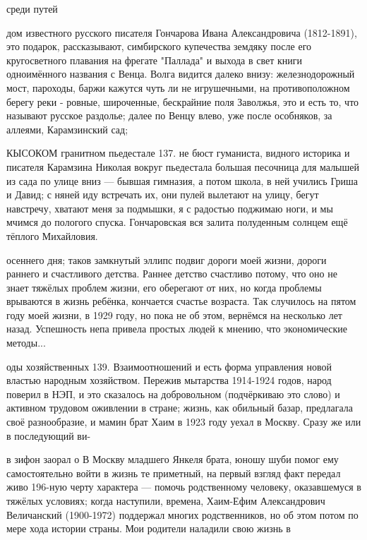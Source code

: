 \label{136-1}
среди путей

дом известного русского писателя Гончарова Ивана Александровича (1812-1891), это подарок, рассказывают, симбирского купечества земдяку после его кругосветного плавания на фрегате "Паллада" и выхода в свет книги одноимённого названия с Венца. Волга видится далеко внизу: железнодорожный мост, пароходы, баржи кажутся чуть ли не игрушечными, на противоположном берегу реки - ровные, широченные, бескрайние поля Заволжья, это и есть то, что называют русское раздолье; далее по Венцу влево, уже после особняков, за аллеями, Карамзинский сад;

\label{137-1}
КЫСОКОМ гранитном пьедестале 137. не бюст гуманиста, видного историка и писателя Карамзина Николая вокруг пьедестала большая песочница для малышей из сада по улице вниз — бывшая гимназия, а потом школа, в ней учились Гриша и Давид; с няней иду встречать их, они пулей вылетают на улицу, бегут навстречу, хватают меня за подмышки, я с радостью поджимаю ноги, и мы мчимся до пологого спуска. Гончаровская вся залита полуденным солнцем ещё тёплого Михайловия.

\label{138-1}
осеннего дня; таков замкнутый эллипс подвиг дороги моей жизни, дороги раннего и счастливого детства. Раннее детство счастливо потому, что оно не знает тяжёлых проблем жизни, его оберегают от них, но когда проблемы врываются в жизнь ребёнка, кончается счастье возраста. Так случилось на пятом году моей жизни, в 1929 году, но пока не об этом, вернёмся на несколько лет назад. Успешность непа привела простых людей к мнению, что экономические методы...

\label{139-1}
оды хозяйственных 139. Взаимоотношений и есть форма управления новой властью народным хозяйством. Пережив мытарства 1914-1924 годов, народ поверил в НЭП, и это сказалось на добровольном (подчёркиваю это слово) и активном трудовом оживлении в стране; жизнь, как обильный базар, предлагала своё разнообразие, и мамин брат Хаим в 1923 году уехал в Москву. Сразу же или в последующий ви-

\label{140-1}
в зифон заорал о В Москву младшего Янкеля брата, юношу шуби помог ему самостоятельно войти в жизнь те приметный, на первый взгляд факт передал живо 196-ную черту характера — помочь родственному человеку, оказавшемуся в тяжёлых условиях; когда наступили, времена, Хаим-Ефим Александрович Величанский (1900-1972) поддержал многих родственников, но об этом потом по мере хода истории страны. Мои родители наладили свою жизнь в

